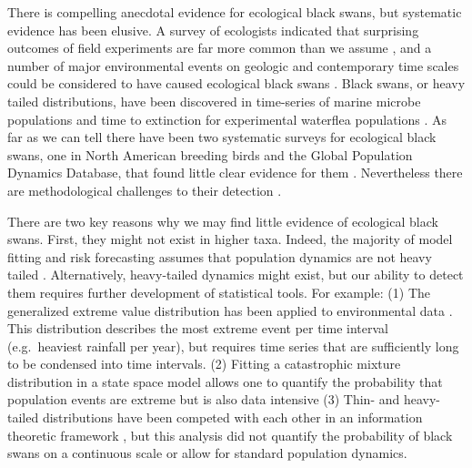 There is compelling anecdotal evidence for ecological black swans, but
systematic evidence has been elusive. A survey of ecologists indicated that
surprising outcomes of field experiments are far more common than we assume
\citep{doak2008}, and a number of major environmental events on geologic and
contemporary time scales could be considered to have caused ecological black
swans \citep{nunez2012}.
Black swans, or heavy tailed distributions, have been discovered in time-series
of marine microbe populations \citet{segura2013} and time to extinction for
experimental waterflea populations \citet{drake2014}. As far as we can tell
there have been two systematic surveys for ecological black swans, one in North
American breeding birds and the Global Population Dynamics Database, that found
little clear evidence for them \citep{keitt1998,allen2001,halley2002}.
Nevertheless there are methodological challenges to their detection
\citep{allen2001,ward2007}.

There are two key reasons why we may find little evidence of ecological black
swans. First, they might not exist in higher taxa. Indeed, the majority of
model fitting and risk forecasting assumes that population dynamics are not
heavy tailed \citep[e.g.][]{brook2006a,dennis2006,knape2012}. Alternatively,
heavy-tailed dynamics might exist, but our ability to detect them requires
further development of statistical tools. For example: (1) The generalized
extreme value distribution has been applied to environmental data
\citep[e.g.][]{katz2005}. This distribution describes the most extreme event
per time interval (e.g.~heaviest rainfall per year), but requires time series
that are sufficiently long to be condensed into time intervals. (2) Fitting
a catastrophic mixture distribution in a state space model allows one to
quantify the probability that population events are extreme but is also data
intensive \citep{ward2007} (3) Thin- and heavy-tailed distributions have been
competed with each other in an information theoretic framework
\citep{halley2002}, but this analysis did not quantify the probability of black
swans on a continuous scale or allow for standard population dynamics.

